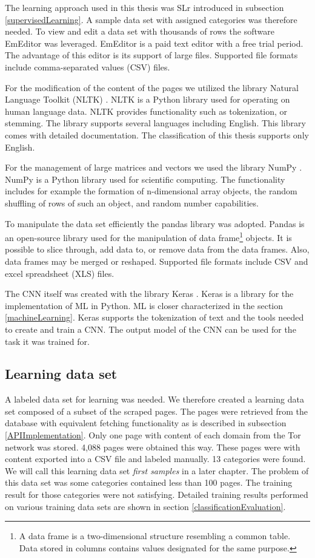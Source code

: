 The learning approach used in this thesis was SLr introduced in subsection \ref{supervisedLearning}. A sample data set with assigned categories was therefore needed. To view and edit a data set with thousands of rows the software EmEditor \cite{emeditor} was leveraged. EmEditor is a paid text editor with a free trial period. The advantage of this editor is its support of large files. Supported file formats include comma-separated values (CSV) files. 

For the modification of the content of the pages we utilized the library Natural Language Toolkit (NLTK) \cite{nltk}. NLTK is a Python library used for operating on human language data. NLTK provides functionality such as tokenization, or stemming. The library supports several languages including English. This library comes with detailed documentation. The classification of this thesis supports only English.

For the management of large matrices and vectors we used the library NumPy \cite{numpy}. NumPy is a Python library used for scientific computing. The functionality includes for example the formation of n-dimensional array objects, the random shuffling of rows of such an object, and random number capabilities. 

To manipulate the data set efficiently the pandas library \cite{pandas} was adopted. Pandas is an open-source library used for the manipulation of data frame\footnote{A data frame is a two-dimensional structure resembling a common table. Data stored in columns contains values designated for the same purpose. } objects. It is possible to slice through, add data to, or remove data from the data frames. Also, data frames may be merged or reshaped. Supported file formats include CSV and excel spreadsheet (XLS) files.

The CNN itself was created with the library Keras \cite{keras}. Keras is a library for the implementation of ML in Python. ML is closer characterized in the section \ref{machineLearning}. Keras supports the tokenization of text and the tools needed to create and train a CNN. The output model of the CNN can be used for the task it was trained for.

\subsection{Learning data set} \label{LearningDatasetImplementation}
A labeled data set for learning was needed. We therefore created a learning data set composed of a subset of the scraped pages. The pages were retrieved from the database with equivalent fetching functionality as is described in subsection \ref{APIImplementation}. Only one page with content of each domain from the Tor network was stored. 4,088 pages were obtained this way. These pages were with content exported into a CSV file and labeled manually. 13 categories were found. We will call this learning data set \textit{first samples} in a later chapter. The problem of this data set was some categories contained less than 100 pages. The training result for those categories were not satisfying. Detailed training results performed on various training data sets are shown in section \ref{classificationEvaluation}. 

